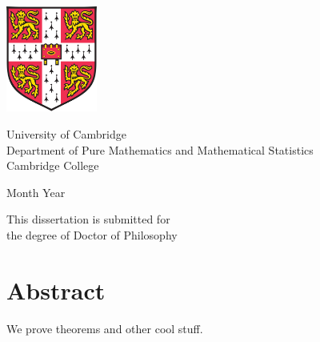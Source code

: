 

%
%
%

\begin{titlepage}
\vspace*{1mm}
\begin{center}
\Huge \MyTitle
\end{center}
\addvspace{18mm}
\begin{center}
\LARGE \MyName
\end{center}
\addvspace{23mm}
\begin{center}
\includegraphics[width=30mm]{data/CUni.png}
\end{center}
\addvspace{18mm}
\begin{center}
\Large University of Cambridge\\
Department of Pure Mathematics and Mathematical Statistics\\
Cambridge College
\end{center}
\addvspace{8mm}
\begin{center}\Large Month Year\end{center}
\addvspace{12mm}
\begin{center}
This dissertation is submitted for\\
the degree of Doctor of Philosophy
\end{center}
\end{titlepage}
\setcounter{page}{2} %
%
\pagestyle{empty}

\clearpage

\setcounter{page}{2}


\chapter*{Abstract}
	We prove theorems and other cool stuff.

